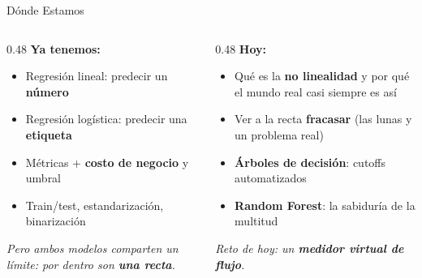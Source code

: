 \documentclass[aspectratio=169, 11pt]{beamer}
\begin{document}
\begin{frame}{Dónde Estamos}
  \vspace{-6pt}
  \begin{columns}[T]
    \begin{column}{0.48\textwidth}
      {\small\color{arcaDark}\bfseries\faCheckCircle\hspace{5pt}Ya tenemos:}
      \vspace{4pt}
      {\footnotesize\color{textMuted}
      \begin{itemize}\setlength{\itemsep}{3pt}
        \item[{\color{codeGreen}\scriptsize\faCheck}]
          Regresión lineal: predecir un \textbf{número}
        \item[{\color{codeGreen}\scriptsize\faCheck}]
          Regresión logística: predecir una \textbf{etiqueta}
        \item[{\color{codeGreen}\scriptsize\faCheck}]
          Métricas + \textbf{costo de negocio} y umbral
        \item[{\color{codeGreen}\scriptsize\faCheck}]
          Train/test, estandarización, binarización
      \end{itemize}
      }
      \vspace{6pt}
      {\scriptsize\color{textMuted}\itshape
        Pero ambos modelos comparten un límite:
        por dentro son \textbf{una recta}.}
    \end{column}
    \begin{column}{0.48\textwidth}
      {\small\color{arcaDark}\bfseries\faForward\hspace{5pt}Hoy:}
      \vspace{4pt}
      {\footnotesize\color{textMuted}
      \begin{itemize}\setlength{\itemsep}{3pt}
        \item[{\color{arcaRed}\scriptsize\faArrowRight}]
          Qué es la \textbf{no linealidad} y por qué el mundo
          real casi siempre es así
        \item[{\color{arcaRed}\scriptsize\faArrowRight}]
          Ver a la recta \textbf{fracasar} (las lunas y un
          problema real)
        \item[{\color{arcaRed}\scriptsize\faArrowRight}]
          \textbf{Árboles de decisión}: cutoffs automatizados
        \item[{\color{arcaRed}\scriptsize\faStar}]
          \textbf{Random Forest}: la sabiduría de la multitud
      \end{itemize}
      }
      \vspace{4pt}
      {\scriptsize\color{arcaDark}\itshape
        Reto de hoy: un \textbf{medidor virtual de flujo}.}
    \end{column}
  \end{columns}
\end{frame}
\end{document}
